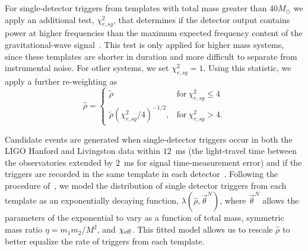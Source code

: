 For single-detector triggers from templates with total mass greater than 40$M_{\odot}$ we apply an additional test, $\chi^2_{r,sg}$, that determines if the detector output contains power at higher frequencies than the maximum expected frequency content of the gravitational-wave signal~\citep{Nitz:2017lco}. This test is only applied for higher mass systems, since these templates are shorter in duration and more difficult to separate from instrumental noise. For other systems, we set $\chi^2_{r,sg} = 1$. Using this statistic, we apply a further re-weighting as
%
\begin{equation}
\label{eq:sg}
 \hat{\rho} = \begin{cases} 
        \tilde{\rho} & \mathrm{for}\ \chi^2_{r,sg} \leq 4 \\
        \tilde{\rho} (\chi^2_{r,sg} / 4)^{-1/2}, & 
        \mathrm{for}\ \chi^2_{r,sg} > 4.
    \end{cases}
\end{equation}

Candidate events are generated when single-detector triggers occur in both the LIGO Hanford and Livingston data within $12$~ms (the light-travel time between the observatories extended by $2$~ms for signal time-measurement error) and if the triggers are recorded in the same template in each detector~\citep{Usman:2015kfa}.  Following the procedure of~\cite{Nitz:2017svb}, we model the distribution of single detector triggers from each template as an exponentially decaying function, $\lambda(\hat{\rho}, \vec{\theta}^N)$, where $\vec{\theta}^N$ allows the parameters of the exponential to vary as a function of total mass, symmetric mass ratio $\eta=m_1m_2/M^2$, and $\chi_{\mathrm{eff}}$. This fitted model allows us to rescale $\hat{\rho}$ to better equalize the rate of triggers from each template.

